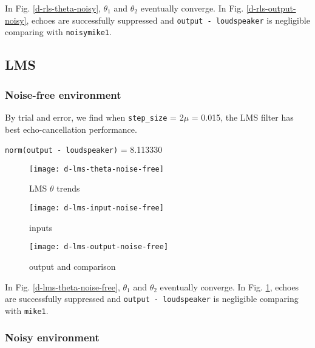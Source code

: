 \documentclass{article}
\begin{document}
In Fig. \ref{d-rls-theta-noisy}, $\theta_1$ and $\theta_2$ eventually converge. In Fig. \ref{d-rls-output-noisy}, echoes are successfully suppressed and \texttt{output - loudspeaker} is negligible comparing with \texttt{noisymike1}.


\subsection*{LMS}

\subsubsection*{Noise-free environment}

By trial and error, we find when \texttt{step\_size} = 2$\mu$ = 0.015, the LMS filter has best echo-cancellation performance.
\begin{center}
\texttt{norm(output - loudspeaker)} = 8.113330
\end{center}

\begin{figure}[H]
\begin{minipage}[t]{0.33\linewidth}
\centering
\texttt{[image: d-lms-theta-noise-free]}
\caption{LMS $\theta$ trends}
\label{d-lms-theta-noise-free}
\end{minipage}
\begin{minipage}[t]{0.33\linewidth}
\centering
\texttt{[image: d-lms-input-noise-free]}
\caption{inputs}
\end{minipage}
\begin{minipage}[t]{0.33\linewidth}
\centering
\texttt{[image: d-lms-output-noise-free]}
\caption{output and comparison}
\label{d-lms-output-noise-free}
\end{minipage}
\end{figure}

In Fig. \ref{d-lms-theta-noise-free}, $\theta_1$ and $\theta_2$ eventually converge. In Fig. \ref{d-lms-output-noise-free}, echoes are successfully suppressed and \texttt{output - loudspeaker} is negligible comparing with \texttt{mike1}.


\subsubsection*{Noisy environment}
\end{document}
